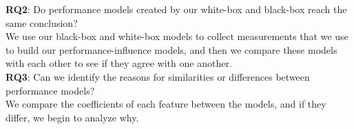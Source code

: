 \noindent \textbf{RQ2}: Do performance models created by our white-box and black-box reach the same conclusion?\\

\noindent We use our black-box and white-box models to collect measurements that we use to build our performance-influence models,
 and then we compare these models with each other to see if they agree with one another. \\

\noindent \textbf{RQ3}: Can we identify the reasons for similarities or differences between performance models?\\

\noindent We compare the coefficients of each feature between the models, and if they differ, we begin to analyze why. \\
